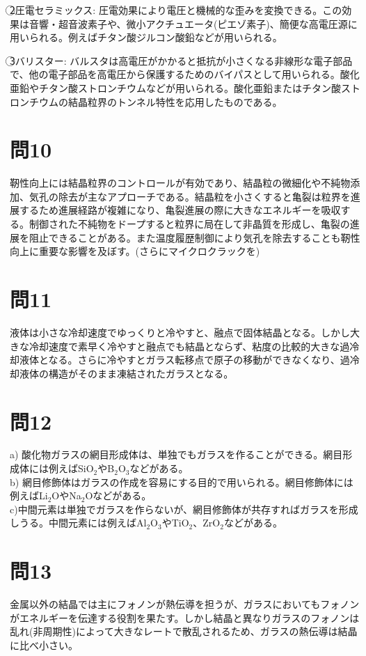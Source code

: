 \documentclass[11pt,a4paper]{jsarticle}
\begin{document}
\textcircled{\scriptsize 2}圧電セラミックス: 
圧電効果により電圧と機械的な歪みを変換できる。この効果は音響・超音波素子や、微小アクチュエータ(ピエゾ素子)、簡便な高電圧源に用いられる。例えばチタン酸ジルコン酸鉛などが用いられる。

\textcircled{\scriptsize 3}バリスター: 
バルスタは高電圧がかかると抵抗が小さくなる非線形な電子部品で、他の電子部品を高電圧から保護するためのバイパスとして用いられる。酸化亜鉛やチタン酸ストロンチウムなどが用いられる。酸化亜鉛またはチタン酸ストロンチウムの結晶粒界のトンネル特性を応用したものである。

\section*{問10}
靭性向上には結晶粒界のコントロールが有効であり、結晶粒の微細化や不純物添加、気孔の除去が主なアプローチである。結晶粒を小さくすると亀裂は粒界を進展するため進展経路が複雑になり、亀裂進展の際に大きなエネルギーを吸収する。制御された不純物をドープすると粒界に局在して非晶質を形成し、亀裂の進展を阻止できることがある。また温度履歴制御により気孔を除去することも靭性向上に重要な影響を及ぼす。(さらにマイクロクラックを)


\section*{問11}
液体は小さな冷却速度でゆっくりと冷やすと、融点で固体結晶となる。しかし大きな冷却速度で素早く冷やすと融点でも結晶とならず、粘度の比較的大きな過冷却液体となる。さらに冷やすとガラス転移点で原子の移動ができなくなり、過冷却液体の構造がそのまま凍結されたガラスとなる。

\section*{問12}
a) 酸化物ガラスの網目形成体は、単独でもガラスを作ることができる。網目形成体には例えばSiO$_2$やB$_2$O$_3$などがある。\\
b) 網目修飾体はガラスの作成を容易にする目的で用いられる。網目修飾体には例えばLi$_2$OやNa$_2$Oなどがある。\\
c)中間元素は単独でガラスを作らないが、網目修飾体が共存すればガラスを形成しうる。中間元素には例えばAl$_2$O$_3$やTiO$_2$、ZrO$_2$などがある。

\section*{問13}
金属以外の結晶では主にフォノンが熱伝導を担うが、ガラスにおいてもフォノンがエネルギーを伝達する役割を果たす。しかし結晶と異なりガラスのフォノンは乱れ(非周期性)によって大きなレートで散乱されるため、ガラスの熱伝導は結晶に比べ小さい。
\end{document}
